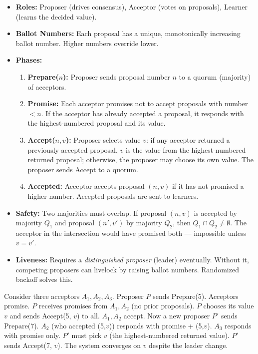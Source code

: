 \begin{itemize}
\item \textbf{Roles:} Proposer (drives consensus), Acceptor (votes on proposals), Learner (learns the decided value).
\item \textbf{Ballot Numbers:} Each proposal has a unique, monotonically increasing ballot number. Higher numbers override lower.
\item \textbf{Phases:}
\begin{enumerate}
\item \textbf{Prepare($n$):} Proposer sends proposal number $n$ to a quorum (majority) of acceptors.
\item \textbf{Promise:} Each acceptor promises not to accept proposals with number $< n$. If the acceptor has already accepted a proposal, it responds with the highest-numbered proposal and its value.
\item \textbf{Accept($n, v$):} Proposer selects value $v$: if any acceptor returned a previously accepted proposal, $v$ is the value from the highest-numbered returned proposal; otherwise, the proposer may choose its own value. The proposer sends Accept to a quorum.
\item \textbf{Accepted:} Acceptor accepts proposal $(n, v)$ if it has not promised a higher number. Accepted proposals are sent to learners.
\end{enumerate}
\item \textbf{Safety:} Two majorities must overlap. If proposal $(n, v)$ is accepted by majority $Q_1$ and proposal $(n', v')$ by majority $Q_2$, then $Q_1 \cap Q_2 \neq \emptyset$. The acceptor in the intersection would have promised both — impossible unless $v = v'$.
\item \textbf{Liveness:} Requires a \emph{distinguished proposer} (leader) eventually. Without it, competing proposers can livelock by raising ballot numbers. Randomized backoff solves this.
\end{itemize}

\begin{example}
Consider three acceptors $A_1, A_2, A_3$. Proposer $P$ sends Prepare(5). Acceptors promise. $P$ receives promises from $A_1, A_2$ (no prior proposals). $P$ chooses its value $v$ and sends Accept(5, $v$) to all. $A_1, A_2$ accept. Now a new proposer $P'$ sends Prepare(7). $A_2$ (who accepted (5,$v$)) responds with promise + (5,$v$). $A_3$ responds with promise only. $P'$ must pick $v$ (the highest-numbered returned value). $P'$ sends Accept(7, $v$). The system converges on $v$ despite the leader change.
\end{example}


